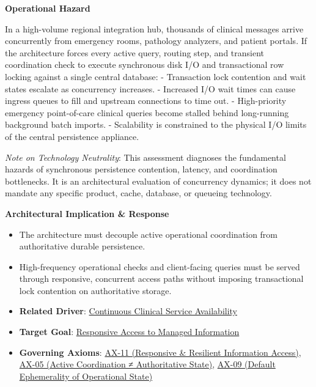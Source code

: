 \par\medskip\textbf{Operational Hazard}\par


In a high-volume regional integration hub, thousands of clinical messages arrive concurrently from emergency rooms, pathology analyzers, and patient portals. If the architecture forces every active query, routing step, and transient coordination check to execute synchronous disk I/O and transactional row locking against a single central database:
- Transaction lock contention and wait states escalate as concurrency increases.
- Increased I/O wait times can cause ingress queues to fill and upstream connections to time out.
- High-priority emergency point-of-care clinical queries become stalled behind long-running background batch imports.
- Scalability is constrained to the physical I/O limits of the central persistence appliance.



\emph{Note on Technology Neutrality}: This assessment diagnoses the fundamental hazards of synchronous persistence contention, latency, and coordination bottlenecks. It is an architectural evaluation of concurrency dynamics; it does not mandate any specific product, cache, database, or queueing technology.



\par\medskip\textbf{Architectural Implication \& Response}\par


\begin{itemize}


\item The architecture must decouple active operational coordination from authoritative durable persistence.

\item High-frequency operational checks and client-facing queries must be served through responsive, concurrent access paths without imposing transactional lock contention on authoritative storage.

\item \textbf{Related Driver}: \href{\detokenize{../../../../../../../../docs/markdown/01-motivation/drivers-assessments/drivers.md}}{Continuous Clinical Service Availability}

\item \textbf{Target Goal}: \href{\detokenize{../../../../../../../../docs/markdown/01-motivation/goals-outcomes/strategic-goals.md}}{Responsive Access to Managed Information}

\item \textbf{Governing Axioms}: \hyperref[element:8a1e995f16954484a78ae1c5c114d546]{AX-11 (Responsive \& Resilient Information Access)}, \hyperref[element:0412a2084f0145babc4f022c71fea65f]{AX-05 (Active Coordination ≠ Authoritative State)}, \hyperref[element:9a5cb9e8876844e58e660f909f7df9fc]{AX-09 (Default Ephemerality of Operational State)}

\end{itemize}

